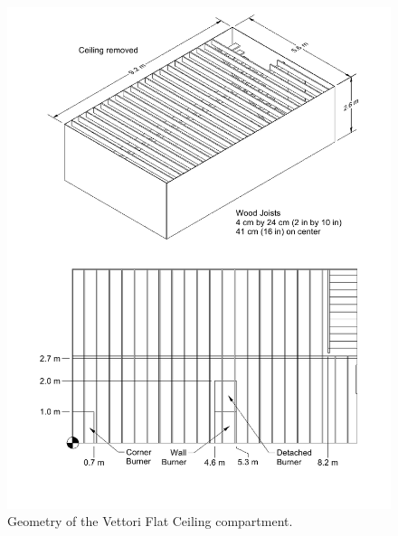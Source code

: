 \begin{figure}[p]
\includegraphics[width=\textwidth]{FIGURES/Vettori_Flat_Ceiling/Vettori_Flat_Ceiling}
\caption[Geometry of the Vettori Flat Ceiling compartment]{Geometry of the Vettori Flat Ceiling compartment.}
\label{Vettori_Drawing}
\end{figure}

